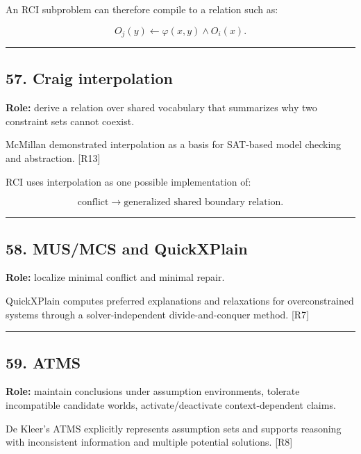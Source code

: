 \documentclass[
]{article}
\begin{document}
An RCI subproblem can therefore compile to a relation such as:

\[
O_j(y)
\leftarrow
\varphi(x,y)
\land
O_i(x).
\]

\begin{center}\rule{0.5\linewidth}{0.5pt}\end{center}

\subsection{57. Craig interpolation}\label{craig-interpolation}

\textbf{Role:} derive a relation over shared vocabulary that summarizes
why two constraint sets cannot coexist.

McMillan demonstrated interpolation as a basis for SAT-based model
checking and abstraction. {[}R13{]}

RCI uses interpolation as one possible implementation of:

\[
\boxed{
\text{conflict}
\to
\text{generalized shared boundary relation}.
}
\]

\begin{center}\rule{0.5\linewidth}{0.5pt}\end{center}

\subsection{58. MUS/MCS and QuickXPlain}\label{musmcs-and-quickxplain}

\textbf{Role:} localize minimal conflict and minimal repair.

QuickXPlain computes preferred explanations and relaxations for
overconstrained systems through a solver-independent divide-and-conquer
method. {[}R7{]}

\begin{center}\rule{0.5\linewidth}{0.5pt}\end{center}

\subsection{59. ATMS}\label{atms}

\textbf{Role:} maintain conclusions under assumption environments,
tolerate incompatible candidate worlds, activate/deactivate
context-dependent claims.

De Kleer's ATMS explicitly represents assumption sets and supports
reasoning with inconsistent information and multiple potential
solutions. {[}R8{]}
\end{document}
